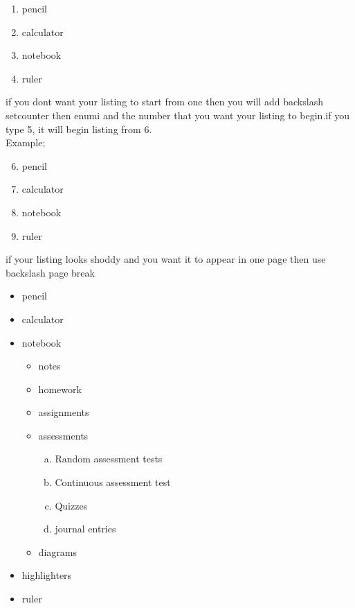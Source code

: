 \documentclass[a4paper,12pt]{article}
\begin{document}
  	 \vspace{0.1cm}
  	 
  	 \begin {enumerate}[.]
  	 \item pencil
  	 \item calculator
  	 \item notebook
  	 \item ruler
  	 \end{enumerate}
  	 
  	 if you dont want your listing to start from one then you will add backslash setcounter then enumi and the number that you want your listing to begin.if you type 5, it will begin listing from 6.\\
  	 
  	 Example;
  	 \begin {enumerate}\setcounter{enumi}{5}
  	 \item pencil
  	 \item calculator
  	 \item notebook
  	 \item ruler
  	 \end{enumerate}
  	 if your listing looks shoddy and you want it to appear in one page then use backslash page break
  	 \pagebreak
  	\begin{itemize}
  		\item pencil
  		\item calculator
  		\item notebook
  		\begin{itemize}
  			\item notes
  			\item homework
  			\item assignments
  			\item assessments
  			\begin{enumerate}[a.]
  				\item Random assessment tests
  				\item Continuous assessment test
  				\item Quizzes
  				\item journal entries
  				
  				
  			\end{enumerate}
  			\item diagrams
  		\end{itemize}
  		\item highlighters
  		\item ruler
  	\end{itemize}
  	
\end{document}
